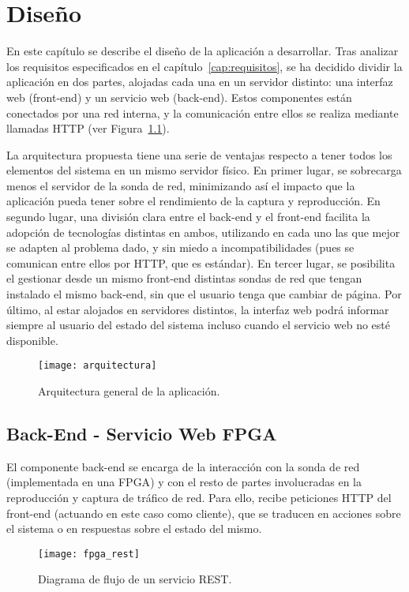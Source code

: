 \chapter{Diseño\label{cap:disenho}}

En este capítulo se describe el diseño de la aplicación a desarrollar.
Tras analizar los requisitos especificados en el capítulo~\ref{cap:requisitos}, se ha decidido dividir la aplicación en dos partes, alojadas cada una en un servidor distinto: una interfaz web (\gls{front-end}) y un servicio web (\gls{back-end}).
Estos componentes están conectados por una red interna, y la comunicación entre ellos se realiza mediante llamadas  \gls{HTTP} (ver Figura~\ref{fig:arquitectura}).

La arquitectura propuesta tiene una serie de ventajas respecto a tener todos los elementos del sistema en un mismo servidor físico.
En primer lugar, se sobrecarga menos el servidor de la sonda de red, minimizando así el impacto que la aplicación pueda tener sobre el rendimiento de la captura y reproducción.
En segundo lugar, una división clara entre el \gls{back-end} y el \gls{front-end} facilita la adopción de tecnologías distintas en ambos, utilizando en cada uno las que mejor se adapten al problema dado, y sin miedo a incompatibilidades (pues se comunican entre ellos por \gls{HTTP}, que es estándar).
En tercer lugar, se posibilita el gestionar desde un mismo \gls{front-end} distintas sondas de red que tengan instalado el mismo \gls{back-end}, sin que el usuario tenga que cambiar de página.
Por último, al estar alojados en servidores distintos, la interfaz web podrá informar siempre al usuario del estado del sistema incluso cuando el servicio web no esté disponible.

\begin{figure}[!htp]
  \centering
  \texttt{[image: arquitectura]}
  \caption{Arquitectura general de la aplicación.}
  \label{fig:arquitectura}
\end{figure}


\section{Back-End - Servicio Web FPGA\label{sec:dis:servicio_web_fpga}}

El componente \gls{back-end} se encarga de la interacción con la sonda de red (implementada en una \gls{FPGA}) y con el resto de partes involucradas en la reproducción y captura de tráfico de red.
Para ello, recibe peticiones \gls{HTTP} del \gls{front-end} (actuando en este caso como cliente), que se traducen en acciones sobre el sistema o en respuestas sobre el estado del mismo.
\begin{figure}[!htp]
  \centering
  \texttt{[image: fpga\_rest]}
  \caption{Diagrama de flujo de un servicio \gls{REST}.}
  \label{fig:fpga_rest}
\end{figure}

